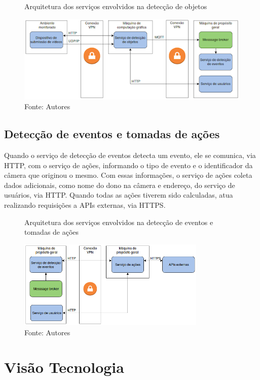 \documentclass[]{politex}
\begin{document}
\begin{figure}[H]
    \centering
    \caption{Arquitetura dos serviços envolvidos na detecção de objetos}
    \includegraphics[width=\textwidth]{arquitetura_objetos}
    \caption*{Fonte: Autores}
    \label{fig:arquitetura_objetos}
\end{figure}

\subsection{Detecção de eventos e tomadas de ações}
Quando o serviço de detecção de eventos detecta um evento, ele se comunica, via HTTP, com o serviço de ações, informando o tipo de evento e o identificador da câmera que originou o mesmo. Com essas informações, o serviço de ações coleta dados adicionais, como nome do dono na câmera e endereço, do serviço de usuários, via HTTP. Quando todas as ações tiverem sido calculadas, atua realizando requisições a APIs externas, via HTTPS.

\begin{figure}[H]
    \centering
    \caption{Arquitetura dos serviços envolvidos na detecção de eventos e tomadas de ações}
    \includegraphics[width=0.8\textwidth]{arquitetura_acoes}
    \caption*{Fonte: Autores}
    \label{fig:arquitetura_acoes}
\end{figure}

\section{Visão Tecnologia}
\end{document}
